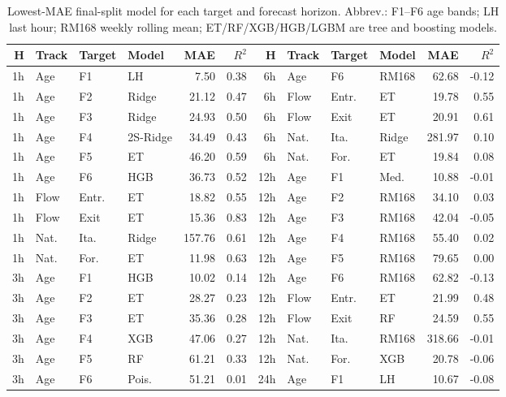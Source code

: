 \begin{table}[!t]
\setlength{\abovecaptionskip}{1pt}
\setlength{\belowcaptionskip}{2pt}
\caption{Lowest-MAE final-split model for each target and forecast horizon. Abbrev.: F1--F6 age bands; LH last hour; RM168 weekly rolling mean; ET/RF/XGB/HGB/LGBM are tree and boosting models.}
\label{tab:all-best-models}
\centering
\tiny
\setlength{\tabcolsep}{1.7pt}
\renewcommand{\arraystretch}{0.72}
\begin{tabular}{@{}rlllrr@{\hspace{0.8em}}rlllrr@{}}
\toprule
H & Track & Target & Model & MAE & $R^2$ & H & Track & Target & Model & MAE & $R^2$ \\
\midrule
1h & Age & F1 & LH & 7.50 & 0.38 & 6h & Age & F6 & RM168 & 62.68 & -0.12 \\
1h & Age & F2 & Ridge & 21.12 & 0.47 & 6h & Flow & Entr. & ET & 19.78 & 0.55 \\
1h & Age & F3 & Ridge & 24.93 & 0.50 & 6h & Flow & Exit & ET & 20.91 & 0.61 \\
1h & Age & F4 & 2S-Ridge & 34.49 & 0.43 & 6h & Nat. & Ita. & Ridge & 281.97 & 0.10 \\
1h & Age & F5 & ET & 46.20 & 0.59 & 6h & Nat. & For. & ET & 19.84 & 0.08 \\
1h & Age & F6 & HGB & 36.73 & 0.52 & 12h & Age & F1 & Med. & 10.88 & -0.01 \\
1h & Flow & Entr. & ET & 18.82 & 0.55 & 12h & Age & F2 & RM168 & 34.10 & 0.03 \\
1h & Flow & Exit & ET & 15.36 & 0.83 & 12h & Age & F3 & RM168 & 42.04 & -0.05 \\
1h & Nat. & Ita. & Ridge & 157.76 & 0.61 & 12h & Age & F4 & RM168 & 55.40 & 0.02 \\
1h & Nat. & For. & ET & 11.98 & 0.63 & 12h & Age & F5 & RM168 & 79.65 & 0.00 \\
3h & Age & F1 & HGB & 10.02 & 0.14 & 12h & Age & F6 & RM168 & 62.82 & -0.13 \\
3h & Age & F2 & ET & 28.27 & 0.23 & 12h & Flow & Entr. & ET & 21.99 & 0.48 \\
3h & Age & F3 & ET & 35.36 & 0.28 & 12h & Flow & Exit & RF & 24.59 & 0.55 \\
3h & Age & F4 & XGB & 47.06 & 0.27 & 12h & Nat. & Ita. & RM168 & 318.66 & -0.01 \\
3h & Age & F5 & RF & 61.21 & 0.33 & 12h & Nat. & For. & XGB & 20.78 & -0.06 \\
3h & Age & F6 & Pois. & 51.21 & 0.01 & 24h & Age & F1 & LH & 10.67 & -0.08 \\

\end{tabular}
\end{table}

